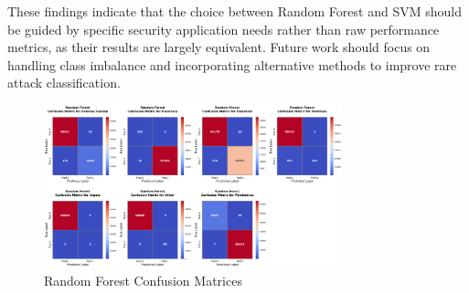             These findings indicate that the choice between Random Forest and SVM should be guided by specific security application needs rather than raw performance metrics, as their results are largely equivalent. Future work should focus on handling class imbalance and incorporating alternative methods to improve rare attack classification.
            
        
        
        
        \clearpage

        
        \begin{figure}[H]
        
            \centering
            
            \begin{minipage}{\textwidth}
                \centering
                \begin{minipage}[c]{\textwidth}
                    \centering
                    \includegraphics[width=0.77\textwidth]{../figures/plots/section2/Random_Forest_normalized_confusion_matrix_test.png}
                    \caption{Random Forest Confusion Matrices}
                    \label{fig:rf_cm_base}
                \end{minipage}%
            \end{minipage}

            \vspace{0.5cm}  %
            

\end{figure}
